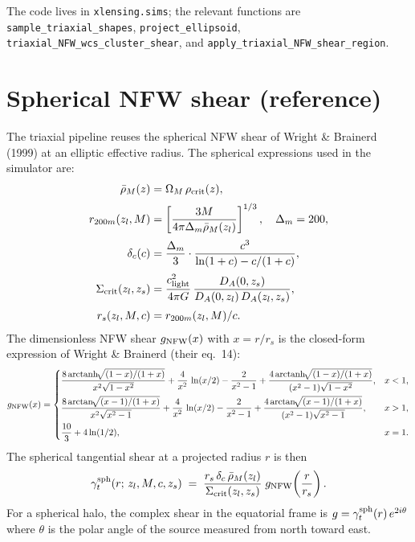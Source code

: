 \documentclass[11pt,a4paper]{article}
\begin{document}
The code lives in \texttt{xlensing.sims}; the relevant functions are
\texttt{sample\_triaxial\_shapes}, \texttt{project\_ellipsoid},
\texttt{triaxial\_NFW\_wcs\_cluster\_shear}, and
\texttt{apply\_triaxial\_NFW\_shear\_region}.

\section{Spherical NFW shear (reference)}

The triaxial pipeline reuses the spherical NFW shear of
Wright \& Brainerd (1999) at an elliptic effective radius. The spherical
expressions used in the simulator are:
\begin{align}
\bar\rho_M(z) &= \Omega_M\,\rho_{\rm crit}(z), \\[2pt]
r_{200m}(z_l, M) &= \left[\frac{3 M}{4\pi \Delta_{m}\bar\rho_M(z_l)}\right]^{1/3},
   \quad \Delta_m = 200, \\[2pt]
\delta_c(c) &= \frac{\Delta_m}{3} \cdot \frac{c^3}{\ln(1+c) - c/(1+c)}, \\[2pt]
\Sigma_{\rm crit}(z_l, z_s) &= \frac{c_{\rm light}^2}{4\pi G}\,
   \frac{D_A(0, z_s)}{D_A(0, z_l)\,D_A(z_l, z_s)}, \\[2pt]
r_s(z_l, M, c) &= r_{200m}(z_l, M)/c.
\end{align}
The dimensionless NFW shear $g_{\rm NFW}(x)$ with $x = r/r_s$ is the
closed-form expression of Wright \& Brainerd (their eq.~14):
\begin{equation}
g_{\rm NFW}(x) =
\begin{cases}
\displaystyle
   \frac{8\,\mathrm{arctanh}\!\sqrt{(1-x)/(1+x)}}{x^2\sqrt{1-x^2}}
 + \frac{4}{x^2}\,\ln(x/2)
 - \frac{2}{x^2-1}
 + \frac{4\,\mathrm{arctanh}\!\sqrt{(1-x)/(1+x)}}{(x^2-1)\sqrt{1-x^2}},
   & x < 1,\\[10pt]
\displaystyle
   \frac{8\,\mathrm{arctan}\!\sqrt{(x-1)/(1+x)}}{x^2\sqrt{x^2-1}}
 + \frac{4}{x^2}\,\ln(x/2)
 - \frac{2}{x^2-1}
 + \frac{4\,\mathrm{arctan}\!\sqrt{(x-1)/(1+x)}}{(x^2-1)\sqrt{x^2-1}},
   & x > 1,\\[10pt]
\displaystyle \frac{10}{3} + 4\ln(1/2),
   & x = 1.
\end{cases}
\end{equation}
The spherical tangential shear at a projected radius $r$ is then
\begin{equation}
\gamma_t^{\rm sph}(r;\,z_l, M, c, z_s)
 \;=\; \frac{r_s\,\delta_c\,\bar\rho_M(z_l)}{\Sigma_{\rm crit}(z_l, z_s)}
       \;g_{\rm NFW}\!\left(\frac{r}{r_s}\right).
\label{eq:gammat-sph}
\end{equation}
For a spherical halo, the complex shear in the equatorial frame is
$g = \gamma_t^{\rm sph}(r)\,e^{2 i \theta}$ where $\theta$ is the polar angle
of the source measured from north toward east.
\end{document}

